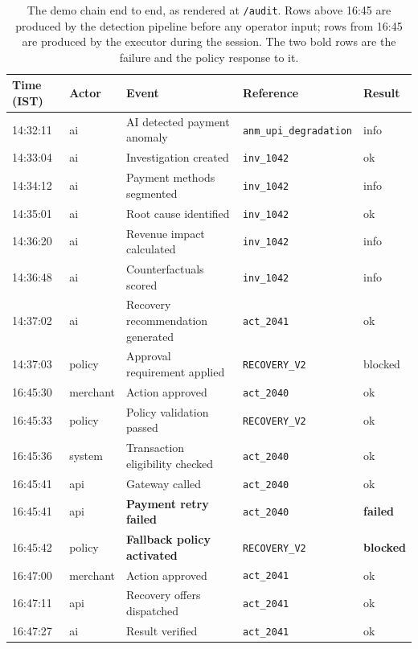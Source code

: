 \documentclass[10pt,twocolumn,a4paper]{article}
\newcommand{\code}[1]{\texttt{\small #1}}
\begin{document}
\begin{table}[t]
\centering
\small
\begin{tabular}{@{}l l l l l@{}}
\toprule
\textbf{Time (IST)} & \textbf{Actor} & \textbf{Event} & \textbf{Reference} & \textbf{Result} \\
\midrule
14:32:11 & ai       & AI detected payment anomaly       & \code{anm\_upi\_degradation} & info \\
14:33:04 & ai       & Investigation created             & \code{inv\_1042}   & ok \\
14:34:12 & ai       & Payment methods segmented         & \code{inv\_1042}   & info \\
14:35:01 & ai       & Root cause identified             & \code{inv\_1042}   & ok \\
14:36:20 & ai       & Revenue impact calculated         & \code{inv\_1042}   & info \\
14:36:48 & ai       & Counterfactuals scored            & \code{inv\_1042}   & info \\
14:37:02 & ai       & Recovery recommendation generated & \code{act\_2041}   & ok \\
14:37:03 & policy   & Approval requirement applied      & \code{RECOVERY\_V2} & blocked \\
16:45:30 & merchant & Action approved                   & \code{act\_2040}   & ok \\
16:45:33 & policy   & Policy validation passed          & \code{RECOVERY\_V2} & ok \\
16:45:36 & system   & Transaction eligibility checked   & \code{act\_2040}   & ok \\
16:45:41 & api      & Gateway called                    & \code{act\_2040}   & ok \\
16:45:41 & api      & \textbf{Payment retry failed}     & \code{act\_2040}   & \textbf{failed} \\
16:45:42 & policy   & \textbf{Fallback policy activated}& \code{RECOVERY\_V2} & \textbf{blocked} \\
16:47:00 & merchant & Action approved                   & \code{act\_2041}   & ok \\
16:47:11 & api      & Recovery offers dispatched        & \code{act\_2041}   & ok \\
16:47:27 & ai       & Result verified                   & \code{act\_2041}   & ok \\
\bottomrule
\end{tabular}
\caption{The demo chain end to end, as rendered at \code{/audit}. Rows above
16:45 are produced by the detection pipeline before any operator input; rows from
16:45 are produced by the executor during the session. The two bold rows are the
failure and the policy response to it.}
\label{tab:audit}
\end{table}
\end{document}
